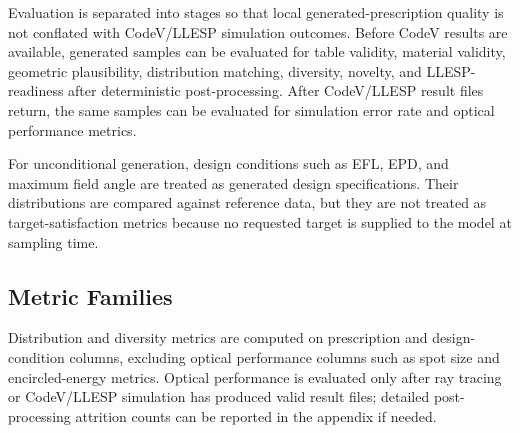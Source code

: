 Evaluation is separated into stages so that local generated-prescription quality is not conflated with CodeV/LLESP simulation outcomes. Before CodeV results are available, generated samples can be evaluated for table validity, material validity, geometric plausibility, distribution matching, diversity, novelty, and LLESP-readiness after deterministic post-processing. After CodeV/LLESP result files return, the same samples can be evaluated for simulation error rate and optical performance metrics.

For unconditional generation, design conditions such as EFL, EPD, and maximum field angle are treated as generated design specifications. Their distributions are compared against reference data, but they are not treated as target-satisfaction metrics because no requested target is supplied to the model at sampling time.

\subsection{Metric Families}

Distribution and diversity metrics are computed on prescription and design-condition columns, excluding optical performance columns such as spot size and encircled-energy metrics. Optical performance is evaluated only after ray tracing or CodeV/LLESP simulation has produced valid result files; detailed post-processing attrition counts can be reported in the appendix if needed.

